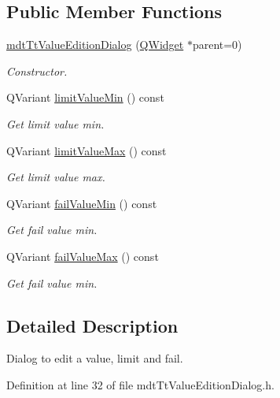 \subsection*{Public Member Functions}
\begin{DoxyCompactItemize}
\item 
\hyperlink{classmdt_tt_value_edition_dialog_a020ae0ffab26fe3bf08e3f2b20d1ba1a}{mdt\-Tt\-Value\-Edition\-Dialog} (\hyperlink{class_q_widget}{Q\-Widget} $\ast$parent=0)
\begin{DoxyCompactList}\small\item\em Constructor. \end{DoxyCompactList}\item 
Q\-Variant \hyperlink{classmdt_tt_value_edition_dialog_a2c356f64315bf14347d9f8b8cfd3a535}{limit\-Value\-Min} () const 
\begin{DoxyCompactList}\small\item\em Get limit value min. \end{DoxyCompactList}\item 
Q\-Variant \hyperlink{classmdt_tt_value_edition_dialog_aa58f6f0c69a9fafaf535e6532cb210ef}{limit\-Value\-Max} () const 
\begin{DoxyCompactList}\small\item\em Get limit value max. \end{DoxyCompactList}\item 
Q\-Variant \hyperlink{classmdt_tt_value_edition_dialog_a6298f3e4cd6920af02a2ec8eca95602f}{fail\-Value\-Min} () const 
\begin{DoxyCompactList}\small\item\em Get fail value min. \end{DoxyCompactList}\item 
Q\-Variant \hyperlink{classmdt_tt_value_edition_dialog_a6623d3ce46c0eadd5c3225f337f9ae3f}{fail\-Value\-Max} () const 
\begin{DoxyCompactList}\small\item\em Get fail value min. \end{DoxyCompactList}\end{DoxyCompactItemize}


\subsection{Detailed Description}
Dialog to edit a value, limit and fail. 

Definition at line 32 of file mdt\-Tt\-Value\-Edition\-Dialog.\-h.



